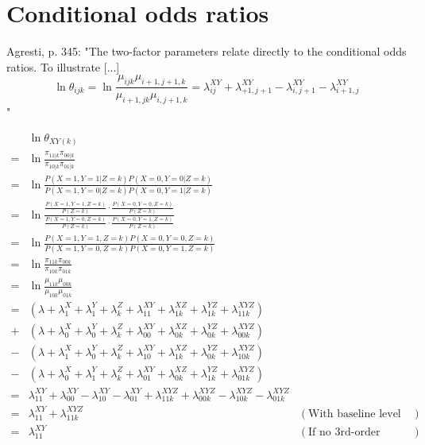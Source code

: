 \documentclass{article}
\begin{document}
\section{Conditional odds ratios}

Agresti, p. 345: "The two-factor parameters relate directly to the conditional odds ratios.
To illustrate [...]
\[\ln \theta_{ijk} = \ln\frac{\mu_{ijk}\mu_{i+1,j+1,k}}{\mu_{i+1,jk}\mu_{i,j+1,k}} = \lambda_{ij}^{XY}+\lambda_{+1,j+1}^{XY}-\lambda_{i,j+1}^{XY}-\lambda_{i+1,j}^{XY}\]
"

\begin{align*}
    & \ln \theta_{XY(k)} \\
    =& \ln \frac{\pi_{11|k}\pi_{00|k}}{\pi_{10|k}\pi_{01|k}} \\
    =& \ln \frac{P(X=1,Y=1|Z=k)P(X=0,Y=0|Z=k)}{P(X=1,Y=0|Z=k)P(X=0,Y=1|Z=k)} \\
    =& \ln \frac{\frac{P(X=1,Y=1,Z=k)}{P(Z=k)}\cdot\frac{P(X=0,Y=0,Z=k)}{P(Z=k)}}{\frac{P(X=1,Y=0,Z=k)}{P(Z=k)}\cdot \frac{P(X=0,Y=1,Z=k)}{P(Z=k)}} \\
    =& \ln \frac{P(X=1,Y=1,Z=k)P(X=0,Y=0,Z=k)}{P(X=1,Y=0,Z=k)P(X=0,Y=1,Z=k)} \\
    =& \ln \frac{\pi_{11k}\pi_{00k}}{\pi_{10k}\pi_{01k}} \\
    =& \ln \frac{\mu_{11k}\mu_{00k}}{\mu_{10k}\mu_{01k}} \\
    =& (\lambda+\lambda_1^X+\lambda_1^Y+\lambda_k^Z+\lambda_{11}^{XY}+\lambda_{1k}^{XZ}+\lambda_{1k}^{YZ}+\lambda_{11k}^{XYZ})\\
    +& (\lambda+\lambda_0^X+\lambda_0^Y+\lambda_k^Z+\lambda_{00}^{XY}+\lambda_{0k}^{XZ}+\lambda_{0k}^{YZ}+\lambda_{00k}^{XYZ})\\
    -& (\lambda+\lambda_1^X+\lambda_0^Y+\lambda_k^Z+\lambda_{10}^{XY}+\lambda_{1k}^{XZ}+\lambda_{0k}^{YZ}+\lambda_{10k}^{XYZ})\\
    -& (\lambda+\lambda_0^X+\lambda_1^Y+\lambda_k^Z+\lambda_{01}^{XY}+\lambda_{0k}^{XZ}+\lambda_{1k}^{YZ}+\lambda_{01k}^{XYZ})\\
    =& \lambda_{11}^{XY}+\lambda_{00}^{XY}-\lambda_{10}^{XY}-\lambda_{01}^{XY}+\lambda_{11k}^{XYZ}+\lambda_{00k}^{XYZ}-\lambda_{10k}^{XYZ}-\lambda_{01k}^{XYZ} \\
    =& \lambda_{11}^{XY}+\lambda_{11k}^{XYZ} & (\text{With baseline level zero}) \\
    =& \lambda_{11}^{XY} & (\text{If no 3rd-order interactions}) \\
\end{align*}
\end{document}
